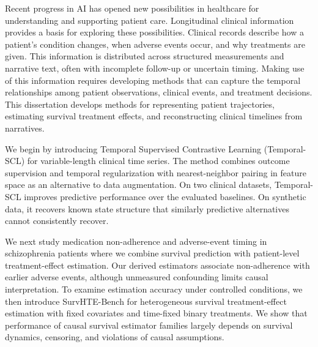 Recent progress in AI has opened new possibilities in healthcare for understanding and supporting patient care. 
Longitudinal clinical information provides a basis for exploring these possibilities. 
Clinical records describe how a patient's condition changes, when adverse events occur, and why treatments are given. 
This information is distributed across structured measurements and narrative text, often with incomplete follow-up or uncertain timing. 
Making use of this information requires developing methods that can capture the temporal relationships among patient observations, clinical events, and treatment decisions. 
This dissertation develops methods for representing patient trajectories, estimating survival treatment effects, and reconstructing clinical timelines from narratives.


We begin by introducing Temporal Supervised Contrastive Learning (Temporal-SCL) for variable-length clinical time series. 
The method combines outcome supervision and temporal regularization with nearest-neighbor pairing in feature space as an alternative to data augmentation. 
On two clinical datasets, Temporal-SCL improves predictive performance over the evaluated baselines. 
On synthetic data, it recovers known state structure that similarly predictive alternatives cannot consistently recover.

We next study medication non-adherence and adverse-event timing in schizophrenia patients where we combine survival prediction with patient-level treatment-effect estimation. 
Our derived estimators associate non-adherence with earlier adverse events, although unmeasured confounding limits causal interpretation. 
To examine estimation accuracy under controlled conditions, we then introduce SurvHTE-Bench for heterogeneous survival treatment-effect estimation with fixed covariates and time-fixed binary treatments. 
We show that performance of causal survival estimator families largely depends on survival dynamics, censoring, and violations of causal assumptions.

